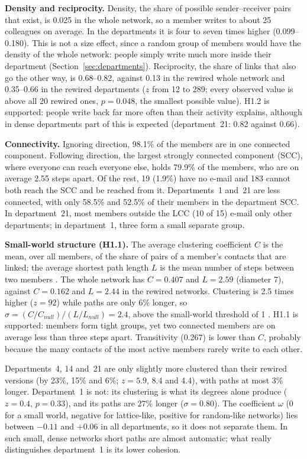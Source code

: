 \documentclass[12pt, a4paper]{article}
\begin{document}
\textbf{Density and reciprocity.} Density, the share of possible
sender--receiver pairs that exist, is 0.025 in the whole network, so a member
writes to about 25 colleagues on average. In the departments it is four to
seven times higher (0.099--0.180). This is not a size effect, since a random
group of members would have the density of the whole network: people simply
write much more inside their department (Section~\ref{sec:departments}).
Reciprocity, the share of links that also go the other way, is 0.68--0.82,
against 0.13 in the rewired whole network and 0.35--0.66 in the rewired
departments ($z$ from 12 to 289; every observed value is above all 20 rewired
ones, $p=0.048$, the smallest possible value). H1.2 is supported: people write
back far more often than their activity explains, although in dense
departments part of this is expected (department~21: 0.82 against 0.66).

\textbf{Connectivity.} Ignoring direction, 98.1\% of the members are in one
connected component. Following direction, the largest strongly connected
component (SCC), where everyone can reach everyone else, holds 79.9\% of the
members, who are on average 2.55 steps apart. Of the rest, 19 (1.9\%) have no
e-mail and 183 cannot both reach the SCC and be reached from it.
Departments~1 and~21 are less connected, with only 58.5\% and 52.5\% of their
members in the department SCC. In department~21, most members outside the LCC
(10 of 15) e-mail only other departments; in department~1, three form a small
separate group.

\textbf{Small-world structure (H1.1).} The average clustering coefficient $C$
is the mean, over all members, of the share of pairs of a member's contacts
that are linked; the average shortest path length $L$ is the mean number of
steps between two members \cite{newman2018}. The whole network has $C=0.407$
and $L=2.59$ (diameter 7), against $C=0.162$ and $L=2.44$ in the rewired
networks. Clustering is 2.5 times higher ($z=92$) while paths are only 6\%
longer, so $\sigma=(C/C_{null})/(L/L_{null})=2.4$, above the small-world
threshold of 1 \cite{watts1998,humphries2008}. H1.1 is supported: members form
tight groups, yet two connected members are on average less than three steps
apart. Transitivity (0.267) is lower than $C$, probably because the many
contacts of the most active members rarely write to each other.

Departments~4, 14 and~21 are only slightly more clustered than their rewired
versions (by 23\%, 15\% and 6\%; $z=5.9$, 8.4 and 4.4), with paths at most 3\%
longer. Department~1 is not: its clustering is what its degrees alone produce
($z=0.4$, $p=0.33$), and its paths are 27\% longer ($\sigma=0.80$). The
coefficient $\omega$ \cite{telesford2011} (0 for a small world, negative for
lattice-like, positive for random-like networks) lies between $-0.11$ and
$+0.06$ in all departments, so it does not separate them. In such small, dense
networks short paths are almost automatic; what really distinguishes
department~1 is its lower cohesion.
\end{document}
